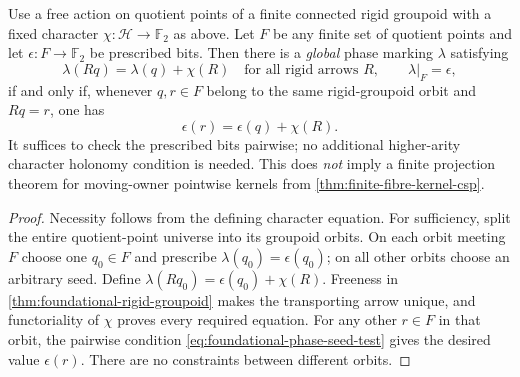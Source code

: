 \begin{lemma}
\label{lem:foundational-finite-phase-extension}
Use a free action on quotient points of a finite connected
rigid groupoid with a fixed character
$\chi:\mathcal H\to\mathbb F_2$ as above. Let $F$ be any
finite set of quotient points and let
$\epsilon:F\to\mathbb F_2$ be prescribed bits.
Then there is a \emph{global} phase marking $\lambda$
satisfying
\[
 \lambda(Rq)=\lambda(q)+\chi(R)
 \quad\text{for all rigid arrows $R$},
 \qquad \lambda|_F=\epsilon ,
\]
if and only if, whenever $q,r\in F$ belong to the
same rigid-groupoid orbit and $Rq=r$, one has
\[
             \epsilon(r)=\epsilon(q)+\chi(R).
 \tag{FS}\label{eq:foundational-phase-seed-test}
\]
It suffices to check the prescribed bits pairwise; no
additional higher-arity character holonomy condition is
needed. This does \emph{not} imply a finite projection
theorem for moving-owner pointwise kernels from
\cref{thm:finite-fibre-kernel-csp}.
\end{lemma}
\begin{proof}
Necessity follows from the defining character equation.
For sufficiency, split the entire quotient-point universe
into its groupoid orbits. On each orbit meeting $F$ choose
one $q_0\in F$ and prescribe $\lambda(q_0)=\epsilon(q_0)$;
on all other orbits choose an arbitrary seed.
Define $\lambda(Rq_0)=\epsilon(q_0)+\chi(R)$.
Freeness in
\cref{thm:foundational-rigid-groupoid}
makes the transporting arrow unique, and
functoriality of $\chi$ proves every required
equation. For any other $r\in F$ in that orbit,
the pairwise condition \eqref{eq:foundational-phase-seed-test}
gives the desired value $\epsilon(r)$.
There are no constraints between different orbits.
\end{proof}
